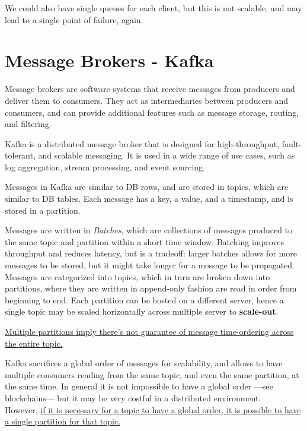 We could also have single queues for each client, but this is not scalable, and may lead to a single point of failure, again.

\section{Message Brokers - Kafka}
Message brokers are software systems that receive messages from producers and deliver them to consumers. They act as intermediaries between producers and consumers, and can provide additional features such as message storage, routing, and filtering.

Kafka is a distributed message broker that is designed for high-throughput, fault-tolerant, and scalable messaging. It is used in a wide range of use cases, such as log aggregation, stream processing, and event sourcing.

Messages in Kafka are similar to DB rows, and are stored in topics, which are similar to DB tables. Each message has a key, a value, and a timestamp, and is stored in a partition.

Messages are written in \textit{Batches}, which are collections of messages produced to the same topic and partition within a short time window. Batching improves throughput and reduces latency, but is a tradeoff: larger batches allows for more messages to be stored, but it might take longer for a message to be propagated.
\\


Messages are categorized into topics, which in turn are broken down into partitions, where they are written in append-only fashion are read in order from beginning to end.
Each partition can be hosted on a different server, hence a single topic may be scaled horizontally across multiple server to \textbf{scale-out}.


\ul{Multiple partitions imply there's not guarantee of message time-ordering across the entire topic.}

Kafka sacrifices a global order of messages for scalability, and allows to have multiple consumers reading from the same topic, and even the same partition, at the same time.
In general it is not impossible to have a global order ---see blockchains--- but it may be very costful in a distributed environment.\\
However, \ul{if it is necessary for a topic to have a global order, it is possible to have a single partition for that topic.}


